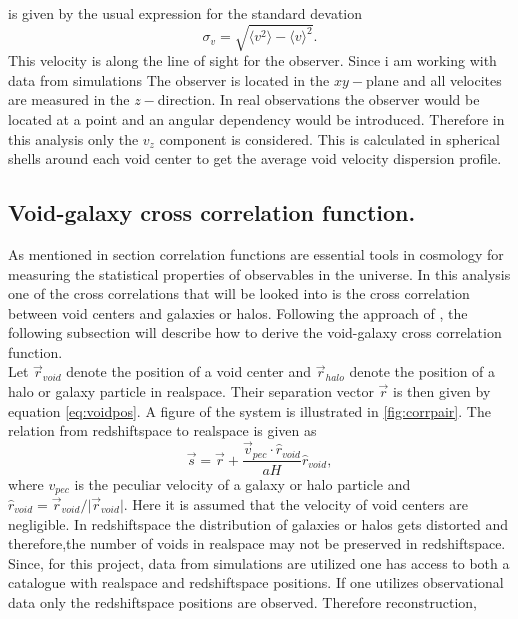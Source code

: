 is given by the usual expression for the standard devation
\begin{equation}\label{eq:sigma_v}
    \sigma_{v} = \sqrt{\langle v^2 \rangle - \langle v\rangle^2}.
\end{equation}
This velocity is along the line of sight for the observer. Since i am working with data from simulations
The observer is located in the $xy-$plane and all velocites are measured in the $z-$direction. In real observations
the observer would be located at a point and an angular dependency would be introduced.
Therefore in this analysis only the $v_z$ component
is considered. This is calculated in spherical shells around each void center to
get the average void velocity dispersion profile.
\subsection{Void-galaxy cross correlation function.}\label{sec:vgcrosscorr}
As mentioned in section  correlation functions are
essential tools in cosmology for measuring the statistical properties of
observables in the universe. In this analysis one of the cross correlations that
will be looked into is the cross correlation between void centers and galaxies
or halos. Following the approach of \cite{Nadathur_corr}, the following
subsection will describe how to derive the void-galaxy cross correlation
function. 
\\\indent
Let $\vec{r}_{void}$ denote the position of a void center and $\vec{r}_{halo}$ denote the
position of a halo or galaxy particle in realspace. Their separation vector $\vec{r}$ is then
given by equation \ref{eq:voidpos}. A figure of the system is illustrated in \ref{fig:corrpair}. The relation from redshiftspace to realspace
is given as
\begin{equation}\label{eq:s_to_r}
    \vec{s}=\vec{r}+\frac{\vec{v}_{pec}\cdot\hat{r}_{void}}{aH}\hat{r}_{void},
\end{equation}
where $v_{pec}$ is the peculiar velocity of a galaxy or halo particle and
$\hat{r}_{void}=\vec{r}_{void}/ \vert \vec{r}_{void}\vert$. Here it is assumed
that the velocity of void centers are negligible. In redshiftspace the distribution of galaxies or halos gets distorted and therefore,the number of voids in
realspace may not be preserved in redshiftspace. Since, for this project, data from simulations are utilized one has access to both a catalogue with realspace and redshiftspace positions. If one utilizes observational data only the redshiftspace positions are observed. Therefore reconstruction,
